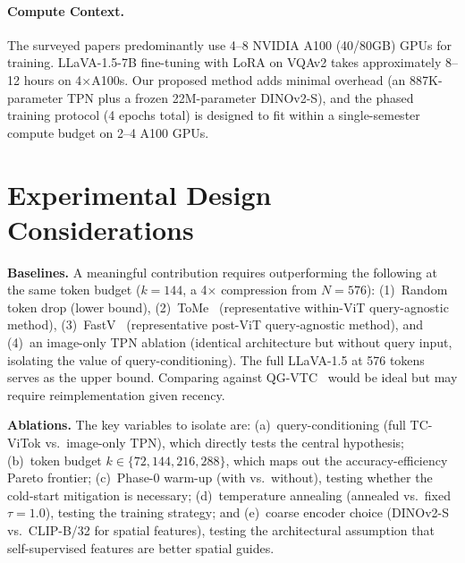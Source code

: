 \documentclass[11pt,twocolumn]{article}
\begin{document}
\paragraph{Compute Context.}
The surveyed papers predominantly use 4--8 NVIDIA A100 (40/80GB) GPUs for training. LLaVA-1.5-7B fine-tuning with LoRA on VQAv2 takes approximately 8--12 hours on 4$\times$A100s. Our proposed method adds minimal overhead (an 887K-parameter TPN plus a frozen 22M-parameter DINOv2-S), and the phased training protocol (4 epochs total) is designed to fit within a single-semester compute budget on 2--4 A100 GPUs.

\section*{Experimental Design Considerations}
\label{sec:expdesign}

\textbf{Baselines.} A meaningful contribution requires outperforming the following at the same token budget ($k = 144$, a 4$\times$ compression from $N = 576$): (1)~Random token drop (lower bound), (2)~ToMe~\cite{bolya2022token} (representative within-ViT query-agnostic method), (3)~FastV~\cite{chen2024fastv} (representative post-ViT query-agnostic method), and (4)~an image-only TPN ablation (identical architecture but without query input, isolating the value of query-conditioning). The full LLaVA-1.5 at 576 tokens serves as the upper bound. Comparing against QG-VTC~\cite{li2025qgvtc} would be ideal but may require reimplementation given recency.

\textbf{Ablations.} The key variables to isolate are: (a)~query-conditioning (full TC-ViTok vs.\ image-only TPN), which directly tests the central hypothesis; (b)~token budget $k \in \{72, 144, 216, 288\}$, which maps out the accuracy-efficiency Pareto frontier; (c)~Phase-0 warm-up (with vs.\ without), testing whether the cold-start mitigation is necessary; (d)~temperature annealing (annealed vs.\ fixed $\tau = 1.0$), testing the training strategy; and (e)~coarse encoder choice (DINOv2-S vs.\ CLIP-B/32 for spatial features), testing the architectural assumption that self-supervised features are better spatial guides.
\end{document}
